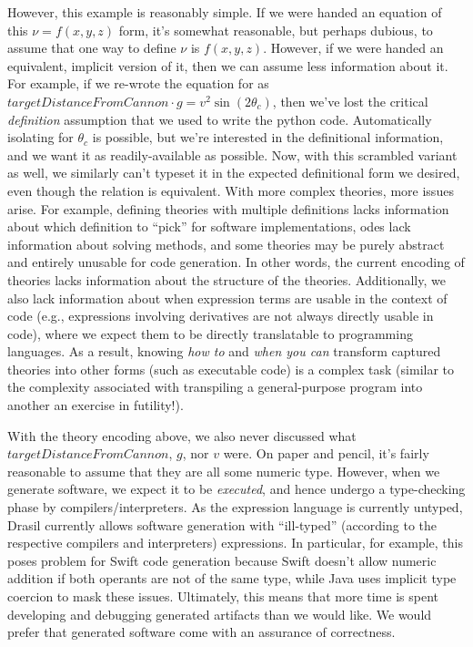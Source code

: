 However, this example is reasonably simple. If we were handed an equation of
this \(\nu{} = f(x,y,z)\) form, it's somewhat reasonable, but perhaps dubious,
to assume that one way to define \(\nu{}\) is \(f(x,y,z)\). However, if we were
handed an equivalent, implicit version of it, then we can assume less
information about it. For example, if we re-wrote the equation for
 as \(\mathit{targetDistanceFromCannon}
\cdot{} g = v^2\sin{}(2\theta{}_c)\), then we've lost the critical
\textit{definition} assumption that we used to write the python code.
Automatically isolating for \(\theta_c\) is possible, but we're interested in
the definitional information, and we want it as readily-available as possible.
Now, with this scrambled variant as well, we similarly can't typeset it in the
expected definitional form we desired, even though the relation is equivalent.
With more complex theories, more issues arise. For example, defining theories
with multiple definitions lacks information about which definition to ``pick''
for software implementations, \acsp{ode} lack information about solving methods,
and some theories may be purely abstract and entirely unusable for code
generation. In other words, the current encoding of theories lacks information
about the structure of the theories. Additionally, we also lack information
about when expression terms are usable in the context of code (e.g., expressions
involving derivatives are not always directly usable in code), where we expect
them to be directly translatable to programming languages. As a result, knowing
\textit{how to} and \textit{when you can} transform captured theories into other
forms (such as executable code) is a complex task (similar to the complexity
associated with transpiling a general-purpose program into another \textemdash{}
an exercise in futility!).

With the theory encoding above, we also never discussed what
\(\mathit{targetDistanceFromCannon}\), \(g\), nor \(v\) were. On paper and
pencil, it's fairly reasonable to assume that they are all some numeric type.
However, when we generate software, we expect it to be \textit{executed}, and
hence undergo a type-checking phase by compilers/interpreters. As the expression
language is currently untyped, Drasil currently allows software generation with
``ill-typed'' (according to the respective compilers and interpreters)
expressions. In particular, for example, this poses problem for Swift code
generation because Swift doesn't allow numeric addition if both operants are not
of the same type, while Java uses implicit type coercion to mask these issues.
Ultimately, this means that more time is spent developing and debugging
generated artifacts than we would like. We would prefer that generated software
come with an assurance of correctness.


